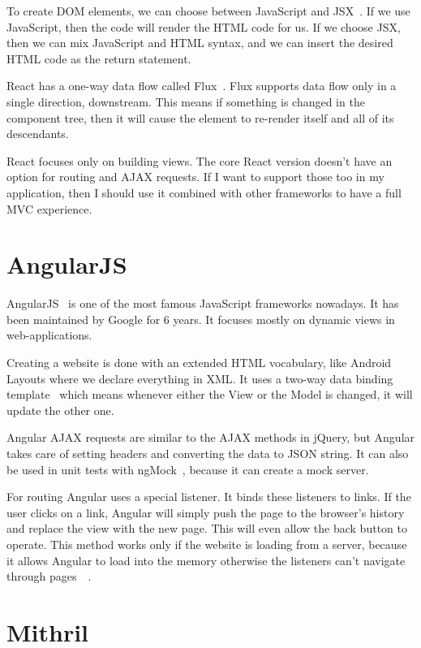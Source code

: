 To create DOM elements, we can choose between JavaScript and JSX~\cite{JSX}. If we use JavaScript, then the code will render the HTML code for us. If we choose JSX, then we can mix JavaScript and HTML syntax, and we can insert the desired HTML code as the return statement. 

React has a one-way data flow called Flux~\cite{Flux}. Flux supports data flow only in a single direction, downstream. This means if something is changed in the component tree, then it will cause the element to re-render itself and all of its descendants.

React focuses only on building views. The core React version doesn't have an option for routing and AJAX requests. If I want to support those too in my application, then I should use it combined with other frameworks to have a full MVC experience.

\section{AngularJS}

AngularJS~\cite{Angular} is one of the most famous JavaScript frameworks nowadays.  It has been maintained by Google for 6 years. It focuses mostly on dynamic views in web-applications. 

Creating a website is done with an extended HTML vocabulary, like Android Layouts where we declare everything in XML.  It uses a two-way data binding template~\cite{Angular-Developer-DataBinding} which means whenever either the View or the Model is changed, it will update the other one.

Angular AJAX requests are similar to the AJAX methods in jQuery, but Angular takes care of setting headers and converting the data to JSON string. It can also be used in unit tests with ngMock~\cite{Angular-AJAX}, because it can create a mock server. 

For routing Angular uses a special listener. It binds these listeners to links. If the user clicks on a link, Angular will simply push the page to the browser's history and replace the view with the new page. This will even allow the back button to operate. This method works only if the website is loading from a server, because it allows Angular to load into the memory otherwise the listeners can't navigate through pages~\cite{Angular-Location}~\cite{Angular-Location2}.


\section{Mithril}

